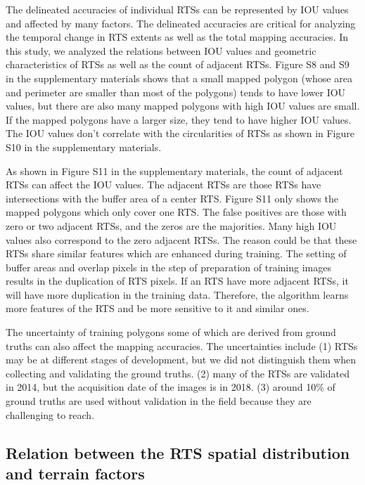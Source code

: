 \documentclass[preprint,12pt,authoryear]{elsarticle}
\begin{document}
The delineated accuracies of individual RTSs can be represented by IOU values and affected by many factors. The delineated accuracies are critical for analyzing the temporal change in RTS extents as well as the total mapping accuracies. In this study, we analyzed the relations between IOU values and geometric characteristics of RTSs as well as the count of adjacent RTSs. Figure S8 and S9 in the supplementary materials shows that a small mapped polygon (whose area and perimeter are smaller than most of the polygons) tends to have lower IOU values, but there are also many mapped polygons with high IOU values are small. If the mapped polygons have a larger size, they tend to have higher IOU values. The IOU values don’t correlate with the circularities of RTSs as shown in Figure S10 in the supplementary materials. 

As shown in Figure S11 in the supplementary materials, the count of adjacent RTSs can affect the IOU values. The adjacent RTSs are those RTSs have intersections with the buffer area of a center RTS. Figure S11 only shows the mapped polygons which only cover one RTS. The false positives are those with zero or two adjacent RTSs, and the zeros are the majorities. Many high IOU values also correspond to the zero adjacent RTSs. The reason could be that these RTSs share similar features which are enhanced during training. The setting of buffer areas and overlap pixels in the step of preparation of training images results in the duplication of RTS pixels. If an RTS have more adjacent RTSs, it will have more duplication in the training data. Therefore, the algorithm learns more features of the RTS and be more sensitive to it and similar ones. 

The uncertainty of training polygons some of which are derived from ground truths can also affect the mapping accuracies. The uncertainties include (1) RTSs may be at different stages of development, but we did not distinguish them when collecting and validating the ground truths. (2) many of the RTSs are validated in 2014, but the acquisition date of the images is in 2018. (3) around 10\% of ground truths are used without validation in the field because they are challenging to reach. 

\subsection{Relation between the RTS spatial distribution and terrain factors}
\label{subsec_spatial_dis_terrain}
\end{document}
